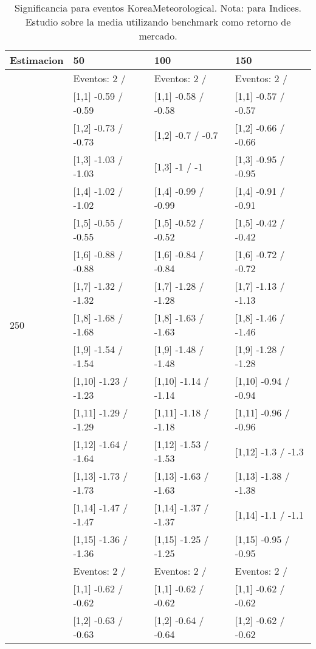\begin{table}

\caption{Significancia para eventos KoreaMeteorological. Nota: para Indices. Estudio sobre la media utilizando benchmark como retorno de mercado.}
\centering
\begin{tabular}[t]{llll}
\toprule
Estimacion & 50 & 100 & 150\\
\midrule
 & Eventos:  2 / & Eventos:  2 / & Eventos:  2 /\\
 & {}[1,1] -0.59  / -0.59 & {}[1,1] -0.58  / -0.58 & {}[1,1] -0.57  / -0.57\\
 & {}[1,2] -0.73  / -0.73 & {}[1,2] -0.7  / -0.7 & {}[1,2] -0.66  / -0.66\\
 & {}[1,3] -1.03  / -1.03 & {}[1,3] -1  / -1 & {}[1,3] -0.95  / -0.95\\
 & {}[1,4] -1.02  / -1.02 & {}[1,4] -0.99  / -0.99 & {}[1,4] -0.91  / -0.91\\
\addlinespace
 & {}[1,5] -0.55  / -0.55 & {}[1,5] -0.52  / -0.52 & {}[1,5] -0.42  / -0.42\\
 & {}[1,6] -0.88  / -0.88 & {}[1,6] -0.84  / -0.84 & {}[1,6] -0.72  / -0.72\\
 & {}[1,7] -1.32  / -1.32 & {}[1,7] -1.28  / -1.28 & {}[1,7] -1.13  / -1.13\\
250 & {}[1,8] -1.68  / -1.68 & {}[1,8] -1.63  / -1.63 & {}[1,8] -1.46  / -1.46\\
 & {}[1,9] -1.54  / -1.54 & {}[1,9] -1.48  / -1.48 & {}[1,9] -1.28  / -1.28\\
\addlinespace
 & {}[1,10] -1.23  / -1.23 & {}[1,10] -1.14  / -1.14 & {}[1,10] -0.94  / -0.94\\
 & {}[1,11] -1.29  / -1.29 & {}[1,11] -1.18  / -1.18 & {}[1,11] -0.96  / -0.96\\
 & {}[1,12] -1.64  / -1.64 & {}[1,12] -1.53  / -1.53 & {}[1,12] -1.3  / -1.3\\
 & {}[1,13] -1.73  / -1.73 & {}[1,13] -1.63  / -1.63 & {}[1,13] -1.38  / -1.38\\
 & {}[1,14] -1.47  / -1.47 & {}[1,14] -1.37  / -1.37 & {}[1,14] -1.1  / -1.1\\
\addlinespace
 & {}[1,15] -1.36  / -1.36 & {}[1,15] -1.25  / -1.25 & {}[1,15] -0.95  / -0.95\\
 & Eventos:  2 / & Eventos:  2 / & Eventos:  2 /\\
 & {}[1,1] -0.62  / -0.62 & {}[1,1] -0.62  / -0.62 & {}[1,1] -0.62  / -0.62\\
 & {}[1,2] -0.63  / -0.63 & {}[1,2] -0.64  / -0.64 & {}[1,2] -0.62  / -0.62\\

\end{tabular}
\end{table}

